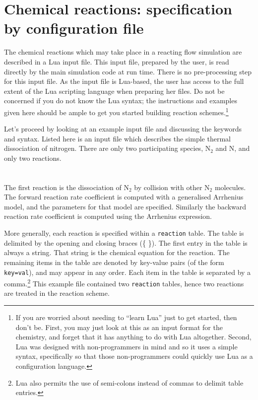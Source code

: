 \section{Chemical reactions: specification by configuration file}
\label{app:chem}
The chemical reactions which may take place in a reacting flow
simulation are described in a Lua input file.
This input file, prepared by the user, is read directly by the
main simulation code at run time.
There is no pre-processing step for this input file.
As the input file is Lua-based, the user has access to the 
full extent of the Lua scripting language when
preparing her files.
Do not be concerned if you do not know the Lua syntax; the instructions
and examples given here should be ample to get you started building
reaction schemes.\footnote{If you are worried about needing to ``learn Lua'' just
to get started, then don't be.  First, you may just look at this as an input
format for the chemistry, and forget that it has anything to do with Lua altogether.
Second, Lua was designed with non-programmers in mind and so it uses a simple syntax, 
specifically so that those non-programmers could quickly use Lua
as a configuration language.}

Let's proceed by looking at an example input file and discussing
the keywords and syntax.
Listed here is an input file which describes the simple thermal
dissociation of nitrogen.
There are only two participating species, N$_2$ and N, and
only two reactions.\\
\topbar\\

\bottombar\\
The first reaction is the dissociation of N$_2$ by collision with other
N$_2$ molecules.
The forward reaction rate coefficient is computed with a generalised
Arrhenius model, and the parameters for that model are specified.
Similarly the backward reaction rate coefficient is computed using
the Arrhenius expression.

More generally, each reaction is specified within a \texttt{reaction} table.
The table is delimited by the opening and closing braces (\{ \}).
The first entry in the table is always a string.
That string is the chemical equation for the reaction.
The remaining items in the table are denoted by key-value pairs (of the form \texttt{key=val}),  and may appear
in any order.
Each item in the table is separated by a comma.\footnote{Lua also permits the use
of semi-colons instead of commas to delimit table entries.}
This example file contained two \texttt{reaction} tables, hence two reactions
are treated in the reaction scheme.

